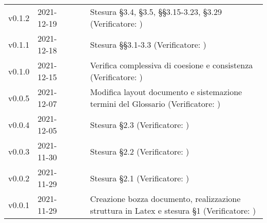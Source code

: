 \begin{longtable}{ m{}<{\centering}  m{}<{\centering}  m{}<{\centering}  m{}<{\centering}  m{}<{\centering} }
	v0.1.2 & 2021-12-19 & \GC{} & \AN{} & Stesura §3.4, §3.5, §§3.15-3.23, §3.29 (Verificatore: \textit{\PV})\\	

	v0.1.1 & 2021-12-18 & \FP{} & \AN{} & Stesura §§3.1-3.3 (Verificatore: \textit{\PV})\\	

	v0.1.0 & 2021-12-15 & \FP{} & \VE{} & Verifica complessiva di coesione e consistenza (Verificatore: \textit{\PV})\\
	
	v0.0.5& 2021-12-07 & \GC{} & \AN{} & Modifica layout documento e sistemazione termini del Glossario (Verificatore: \textit{\PV{}})\\

	v0.0.4& 2021-12-05 & \LW{} & \AN{} & Stesura §2.3 (Verificatore: \textit{\PV{}})\\

	v0.0.3& 2021-11-30 & \GC & \AN{} & Stesura §2.2 (Verificatore: \textit{\PV{}})\\

	v0.0.2& 2021-11-29 & \FP{} & \AN{} & Stesura §2.1 (Verificatore: \textit{\PV{}})\\

	v0.0.1& 2021-11-29 & \LW{} & \AN{} & Creazione bozza documento, realizzazione struttura in Latex e stesura §1 (Verificatore: \textit{\PV{}})\\

\end{longtable}

\pagebreak